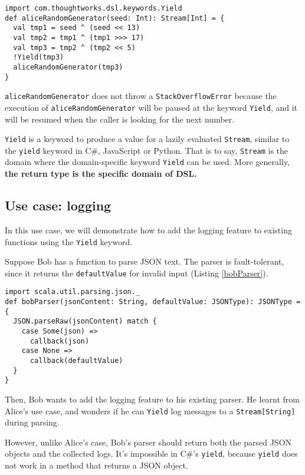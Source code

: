 \begin{lstlisting}[caption={The implementation of Alice's pseudo-random number generator},label={generatedNumbers}]
import com.thoughtworks.dsl.keywords.Yield
def aliceRandomGenerator(seed: Int): Stream[Int] = {
  val tmp1 = seed ^ (seed << 13)
  val tmp2 = tmp1 ^ (tmp1 >>> 17)
  val tmp3 = tmp2 ^ (tmp2 << 5)
  !Yield(tmp3)
  aliceRandomGenerator(tmp3)
}
\end{lstlisting}

\lstinline{aliceRandomGenerator} does not throw a \lstinline{StackOverflowError} because the execution of \lstinline{aliceRandomGenerator} will be paused at the keyword \lstinline{Yield}, and it will be resumed when the caller is looking for the next number.

\lstinline{Yield} is a keyword to produce a value for a lazily evaluated \lstinline{Stream}, similar to the \lstinline{yield} keyword in C\#, JavaScript or Python. That is to say, \lstinline{Stream} is the domain where the domain-specific keyword \lstinline{Yield} can be used. More generally, \textbf{the return type is the specific domain of DSL.}

\subsection{Use case: logging}

In this use case, we will demonstrate how to add the logging feature to existing functions using the \lstinline{Yield} keyword.

Suppose Bob has a function to parse JSON text. The parser is fault-tolerant, since it returns the \lstinline{defaultValue} for invalid input  (Listing \ref{bobParser}).

\begin{lstlisting}[caption={The original implementation of Bob's parser},label={bobParser}]
import scala.util.parsing.json._
def bobParser(jsonContent: String, defaultValue: JSONType): JSONType = {
  JSON.parseRaw(jsonContent) match {
    case Some(json) =>
      callback(json)
    case None =>
      callback(defaultValue)
  }
}
\end{lstlisting}

Then, Bob wants to add the logging feature to his existing parser. He learnt from Alice's use case, and wonders if he can \lstinline{Yield} log messages to a \lstinline{Stream[String]} during parsing.

However, unlike Alice's case, Bob's parser should return both the parsed JSON objects and the collected logs. It's impossible in C\#'s \lstinline{yield}, because \lstinline{yield} does not work in a method that returns a JSON object.

